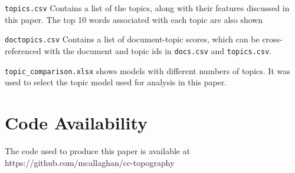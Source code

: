 \documentclass{article}
\begin{document}
	\medskip\noindent
	\texttt{topics.csv} Contains a list of the topics, along with their features discussed in this paper. The top 10 words associated with each topic are also shown
	
	\medskip\noindent
	\texttt{doctopics.csv} Contains a list of document-topic scores, which can be cross-referenced with the document and topic ids in \texttt{docs.csv} and \texttt{topics.csv}.
	
	\medskip\noindent
	\texttt{topic\_comparison.xlsx} shows models with different numbers of topics. It was used to select the topic model used for analysis in this paper.
	
	\section*{Code Availability}
	
	The code used to produce this paper is available at https://github.com/mcallaghan/cc-topography
	
	
	
	
	
	
	
\end{document}
